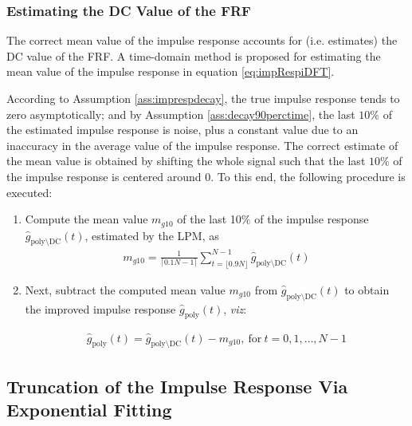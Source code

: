 \subsubsection{Estimating the DC Value of the FRF}\label{se:DCvalueEst}



The correct mean value of the impulse response accounts for (i.e. estimates) the DC value of the FRF. A time-domain method is proposed for estimating the mean value of the impulse response in equation \eqref{eq:impRespiDFT}. %









According to Assumption \ref{ass:imprespdecay}, the true impulse response tends   to zero asymptotically; and by Assumption \ref{ass:decay90perctime}, the last $10\%$ of the estimated impulse response is noise, plus a constant value due to an inaccuracy in the average value of the impulse response. The correct estimate of the mean value is obtained by shifting the whole signal such that the last $10\%$ of the impulse response is centered around 0.
To this end, the following procedure is executed:


\begin{enumerate}
\item Compute the mean value $m_{g10}$ of the last 10\% of the impulse response $\hat g_{\mathrm{poly}\setminus \mathrm{DC
}}(t)$, estimated by the LPM, as %
\begin{align}
m_{g10} = \frac{1}{\lceil0.1N - 1\rceil}\sum_{t=\lfloor0.9N\rfloor}^{N-1}\hat g_{\mathrm{poly}\setminus \mathrm{DC
}}(t)
\end{align}

\item Next, subtract the computed mean value $m_{g10}$ from $\hat g_{\mathrm{poly}\setminus \mathrm{DC
}}(t)$ to obtain the improved impulse response $\hat g_\mathrm{poly}(t)$, \emph{viz}:


\begin{align}
\hat g_\mathrm{poly}(t) = \hat g_{\mathrm{poly}\setminus \mathrm{DC
}}(t) - m_{g10},\ \text{for}\ t=0,1,\dots,N-1
\end{align}


\end{enumerate}

\subsection{Truncation of the Impulse Response Via Exponential Fitting}\label{se:truncImpulseResp}

